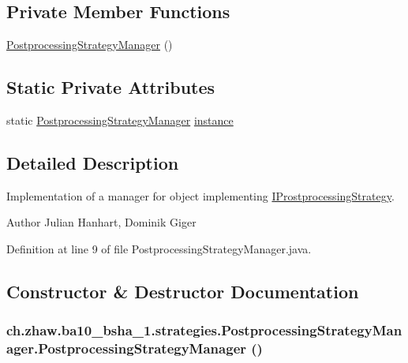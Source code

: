 \subsection*{Private Member Functions}
\begin{DoxyCompactItemize}
\item 
\hyperlink{classch_1_1zhaw_1_1ba10__bsha__1_1_1strategies_1_1PostprocessingStrategyManager_af7aed4d9e6de8e5afeddbd81d73708b8}{PostprocessingStrategyManager} ()
\end{DoxyCompactItemize}
\subsection*{Static Private Attributes}
\begin{DoxyCompactItemize}
\item 
static \hyperlink{classch_1_1zhaw_1_1ba10__bsha__1_1_1strategies_1_1PostprocessingStrategyManager}{PostprocessingStrategyManager} \hyperlink{classch_1_1zhaw_1_1ba10__bsha__1_1_1strategies_1_1PostprocessingStrategyManager_a00a270ffa254966fbdf5366a470b1ebf}{instance}
\end{DoxyCompactItemize}


\subsection{Detailed Description}
Implementation of a manager for object implementing \hyperlink{}{IProstprocessingStrategy}.

\begin{DoxyAuthor}{Author}
Julian Hanhart, Dominik Giger 
\end{DoxyAuthor}


Definition at line 9 of file PostprocessingStrategyManager.java.

\subsection{Constructor \& Destructor Documentation}
\hypertarget{classch_1_1zhaw_1_1ba10__bsha__1_1_1strategies_1_1PostprocessingStrategyManager_af7aed4d9e6de8e5afeddbd81d73708b8}{
\subsubsection[{PostprocessingStrategyManager}]{\setlength{\rightskip}{0pt plus 5cm}ch.zhaw.ba10\_\-bsha\_\-1.strategies.PostprocessingStrategyManager.PostprocessingStrategyManager ()}}
\label{classch_1_1zhaw_1_1ba10__bsha__1_1_1strategies_1_1PostprocessingStrategyManager_af7aed4d9e6de8e5afeddbd81d73708b8}



